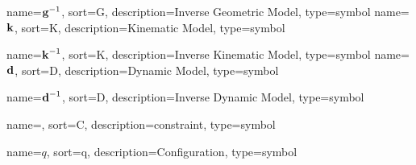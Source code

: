 	{%
		name={\ensuremath{{\vecfunc{g}^{-1}}}},
		sort=G,
		description=Inverse Geometric Model,
		type=symbol
	}
	\newcommand{\invgeometricmodel}{\gls{sym:invgeometricmodel}}
	{%
		name={\ensuremath{\vecfunc{k}}},
		sort=K,
		description=Kinematic Model,
		type=symbol
	}
	\newcommand{\kinematicmodel}{\gls{sym:kinematicmodel}}

	{%
		name={\ensuremath{{\vecfunc{k}^{-1}}}},
		sort=K,
		description=Inverse Kinematic Model,
		type=symbol
	}
	\newcommand{\invkinematicmodel}{\gls{sym:invkinematicmodel}}
	{%
		name={\ensuremath{\vecfunc{d}}},
		sort=D,
		description=Dynamic Model,
		type=symbol
	}
	\newcommand{\dynamicmodel}{\gls{sym:dynamicmodel}}

	{%
		name={\ensuremath{{\vecfunc{d}^{-1}}}},
		sort=D,
		description=Inverse Dynamic Model,
		type=symbol
	}
	\newcommand{\invdynamicmodel}{\gls{sym:invdynamicmodel}}

	{%
		name=\protect{},
		sort=C,
		description=constraint,
		type=symbol
	}
	\newcommand{\constraint}{\gls{sym:constraint}}

	{%
		name=\ensuremath{q},
		sort=q,
		description=Configuration,
		type=symbol
	}
	\newcommand{\configuration}{\gls{sym:configuration}}

